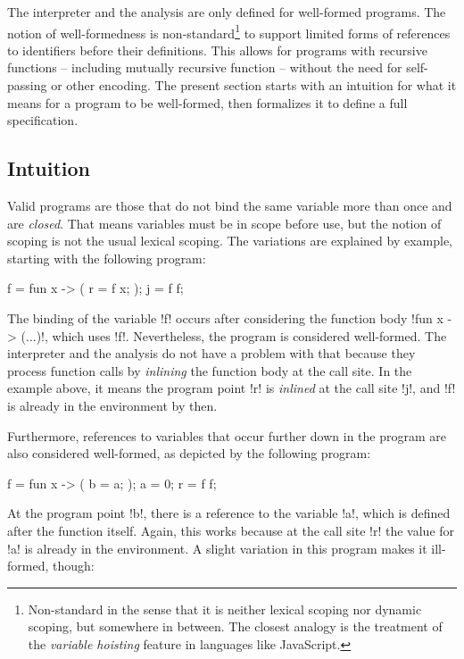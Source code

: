 \documentclass[nocopyright]{sigplanconf}
\begin{document}
The interpreter and the analysis are only defined for well-formed programs.  The notion of well-formedness is non-standard\footnote{Non-standard in the sense that it is neither lexical scoping nor dynamic scoping, but somewhere in between.  The closest analogy is the treatment of the \emph{variable hoisting} feature in languages like JavaScript.} to support limited forms of references to identifiers before their definitions.  This allows for programs with recursive functions -- including mutually recursive function -- without the need for self-passing or other encoding.  The present section starts with an intuition for what it means for a program to be well-formed, then formalizes it to define a full specification.

\subsection{Intuition}

Valid programs are those that do not bind the same variable more than once and are \emph{closed}.  That means variables must be in scope before use, but the notion of scoping is not the usual lexical scoping.  The variations are explained by example, starting with the following program:

\begin{plang}
f = fun x -> (
  r = f x;
);
j = f f;
\end{plang}

The binding of the variable \plangil!f! occurs after considering the function body \plangil!fun x -> (...)!, which uses \plangil!f!.  Nevertheless, the program is considered well-formed.  The interpreter and the analysis do not have a problem with that because they process function calls by \emph{inlining} the function body at the call site.  In the example above, it means the program point \plangil!r! is \emph{inlined} at the call site \plangil!j!, and \plangil!f! is already in the environment by then.

Furthermore, references to variables that occur further down in the program are also considered well-formed, as depicted by the following program:

\begin{plang}
f = fun x -> (
  b = a;
);
a = 0;
r = f f;
\end{plang}

At the program point \plangil!b!, there is a reference to the variable \plangil!a!, which is defined after the function itself.  Again, this works because at the call site \plangil!r! the value for \plangil!a! is already in the environment.  A slight variation in this program makes it ill-formed, though:
\end{document}
